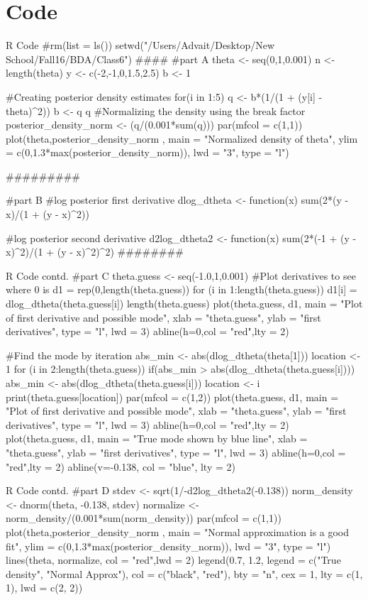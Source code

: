 \documentclass{article}
\begin{document}
\section{Code}
\begin{sexylisting}{R Code}
#rm(list = ls())
setwd("/Users/Advait/Desktop/New School/Fall16/BDA/Class6")
####
#part A
theta <- seq(0,1,0.001)
n <- length(theta)
y <- c(-2,-1,0,1.5,2.5)
b <- 1

#Creating posterior density estimates
for(i in 1:5){ 
  q <- b*(1/(1 + (y[i] - theta)^2))
  b <- q
}
q
#Normalizing the density using the break factor
posterior_density_norm <- (q/(0.001*sum(q)))
par(mfcol = c(1,1))
plot(theta,posterior_density_norm ,
     main = "Normalized density of theta",
     ylim = c(0,1.3*max(posterior_density_norm)),
     lwd = "3",
     type = "l")
     
#########

#part B
#log posterior first derivative
dlog_dtheta <- function(x) {
  sum(2*(y - x)/(1 + (y - x)^2))
}

#log posterior second derivative
d2log_dtheta2 <- function(x){
  sum(2*(-1 + (y - x)^2)/(1 + (y - x)^2)^2)
}
########
\end{sexylisting}
\newpage
\begin{sexylisting}{R Code contd.}
#part C
theta.guess <- seq(-1.0,1,0.001)
#Plot derivatives to see where 0 is
d1 = rep(0,length(theta.guess))
for (i in 1:length(theta.guess)){
  d1[i] = dlog_dtheta(theta.guess[i])  
}    
length(theta.guess)
plot(theta.guess, d1,
     main = "Plot of first derivative and possible mode",
     xlab = "theta.guess",
     ylab = "first derivatives",
     type = "l",
     lwd = 3)
abline(h=0,col = "red",lty = 2)

#Find the mode by iteration
abs_min <- abs(dlog_dtheta(theta[1]))
location <- 1
for (i in 2:length(theta.guess)){
  if(abs_min > abs(dlog_dtheta(theta.guess[i])))
  {abs_min <- abs(dlog_dtheta(theta.guess[i]))
   location <- i
  }
}
print(theta.guess[location])
par(mfcol = c(1,2))
plot(theta.guess, d1,
     main = "Plot of first derivative and possible mode",
     xlab = "theta.guess",
     ylab = "first derivatives",
     type = "l",
     lwd = 3)
abline(h=0,col = "red",lty = 2)
plot(theta.guess, d1,
     main = "True mode shown by blue line",
     xlab = "theta.guess",
     ylab = "first derivatives",
     type = "l",
     lwd = 3)
abline(h=0,col = "red",lty = 2)
abline(v=-0.138, col = "blue", lty = 2)
\end{sexylisting}
\newpage
\begin{sexylisting}{R Code contd.}
#part D
stdev <- sqrt(1/-d2log_dtheta2(-0.138))
norm_density <- dnorm(theta, -0.138, stdev)
normalize <- norm_density/(0.001*sum(norm_density))
par(mfcol = c(1,1))
plot(theta,posterior_density_norm ,
     main = "Normal approximation is a good fit",
     ylim = c(0,1.3*max(posterior_density_norm)),
     lwd = "3",
     type = "l")
lines(theta, normalize, col = "red",lwd = 2)
legend(0.7, 1.2, legend = c("True density", "Normal Approx"), 
           col = c("black", "red"),
           bty = "n", cex = 1, lty = c(1, 1), lwd = c(2, 2))

\end{sexylisting}



 
  
\end{document}
